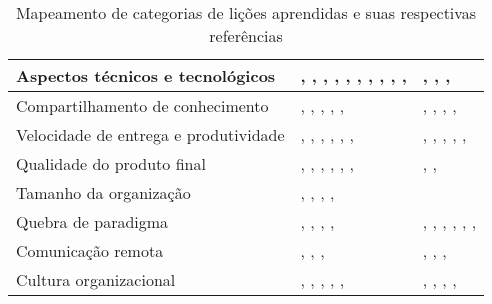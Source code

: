 \begin{table}[H]
\begin{tabularx}{\linewidth}{ | p{6cm} | X | X | }
		\hline 
		Aspectos técnicos e tecnológicos & \cite{Block2011}, \cite{Microsoft2013}, \cite{Korhonen2010}, \cite{Cisco2011}, \cite{Lapham2012}, \cite{Eunha2012}, \cite{Fitzgerald2013}, \cite{Arikpo2011}, \cite{Bustard2013}, \cite{Radha2012}, \cite{Nokia2013} & \cite{Piegas2012}, \cite{Queiroz2013}, \cite{Stefano2013}, \cite{Karaj2013} \\ 
		\hline 
		Compartilhamento de conhecimento & \cite{Asnawi2012}, \cite{Cisco2011}, \cite{Lapham2012}, \cite{Radha2012}, \cite{Eunha2012}, \cite{Ericsson2013} & \cite{Valerio2013}, \cite{Vieira2013}, \cite{Queiroz2013}, \cite{Bastos2013}, \cite{Maciel2013} \\ 
		\hline 
		Velocidade de entrega e produtividade & \cite{Adobe2012}, \cite{Fitzgerald2013}, \cite{Microsoft2013}, \cite{Cisco2011}, \cite{Korhonen2010}, \cite{Eunha2012}, \cite{Claudia2013} & \cite{Stefano2013}, \cite{Queiroz2013}, \cite{Maciel2013}, \cite{Hui2013}, \cite{Ahmed2008}, \cite{Piegas2012} \\ 
		\hline 
		Qualidade do produto final & \cite{Adobe2012}, \cite{Fitzgerald2013}, \cite{Bustard2013}, \cite{Lapham2012}, \cite{Eunha2012}, \cite{Claudia2013}, \cite{Korhonen2010} & \cite{Parzinello2012}, \cite{Maciel2013}, \cite{Ahmed2008} \\ 
		\hline 
		Tamanho da organização & \cite{Bustard2013}, \cite{Microsoft2013}, \cite{Claudia2013}, \cite{Korhonen2010}, \cite{Ericsson2013} & \cite{Maciel2013} \\ 
		\hline 
		Quebra de paradigma & \cite{Hajjdiab2011}, \cite{Block2011}, \cite{Korhonen2010}, \cite{Lapham2012}, \cite{Arikpo2011} & \cite{Stefano2013}, \cite{Bastos2013}, \cite{Maciel2013}, \cite{Parzinello2012}, \cite{Hui2013}, \cite{Ahmed2008}, \cite{Sahota2012} \\ 
		\hline 
		Comunicação remota & \cite{Adobe2012}, \cite{Microsoft2013}, \cite{Korhonen2010}, \cite{Radha2012} & \cite{Rodrigues2013}, \cite{Vieira2013}, \cite{Bastos2013}, \cite{Maciel2013} \\ 
		\hline 
		Cultura organizacional & \cite{Bustard2013}, \cite{Microsoft2013}, \cite{Claudia2013}, \cite{Nokia2013}, \cite{Eunha2012}, \cite{Fitzgerald2013} & \cite{Rodrigues2013}, \cite{Bastos2013}, \cite{Srinath2012}, \cite{Maciel2013}, \cite{Sahota2012} \\ 
		\hline 
		\end{tabularx}
		\caption{Mapeamento de categorias de lições aprendidas e suas respectivas referências}
		\label{tab:mapeamentoCategorias}
		\end{table}
